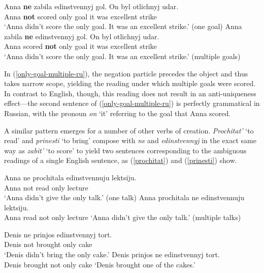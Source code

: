 \documentclass{article}
\begin{document}
\begin{exe}
	\ex \label{only-goal-one-ru} \gll Anna \textbf{ne} zabila edinstvennyj gol. On byl otlichnyj udar.\\
	Anna \textbf{not} scored only goal it was excellent strike\\
	\glt `Anna didn't score the only goal. It was an excellent strike.' (one goal)
	\ex \label{only-goal-multiple-ru} \gll Anna zabila \textbf{ne} edinstvennyj gol. On byl otlichnyj udar.\\
	Anna scored \textbf{not} only goal it was excellent strike\\
	\glt `Anna didn't score the only goal. It was an excellent strike.' (multiple goals)
\end{exe}

In (\ref{only-goal-multiple-ru}), the negation particle precedes the object and thus takes narrow scope, yielding the reading under which multiple goals were scored. In contrast to English, though, this reading does not result in an anti-uniqueness effect---the second sentence of (\ref{only-goal-multiple-ru}) is perfectly grammatical in Russian, with the pronoun \textit{on} `it' referring to the goal that Anna scored.


A similar pattern emerges for a number of other verbs of creation. \textit{Prochitat'} `to read' and \textit{prinesti} `to bring' compose with \textit{ne} and \textit{edinstvennyj} in the exact same way as \textit{zabit'} `to score' to yield two sentences corresponding to the ambiguous readings of a single English sentence, as (\ref{prochitat}) and (\ref{prinesti}) show.

\begin{exe}
	\ex \label{prochitat} \begin{xlist}
		\ex \gll Anna ne prochitala edinstvennuju lektsiju.\\
		Anna not read only lecture\\
		\glt `Anna didn't give the only talk.' (one talk)
		\ex Anna prochitala ne edinstvennuju lektsiju.\\
		Anna read not only lecture
		\glt `Anna didn't give the only talk.' (multiple talks)
	\end{xlist}
	\ex \label{prinesti} \begin{xlist}
		\ex \gll Denis ne prinjos edinstvennyj tort.\\
		Denis not brought only cake\\
		\glt `Denis didn't bring the only cake.'
		\ex Denis prinjos ne edinstvennyj tort.\\
		Denis brought not only cake
		\glt `Denis brought one of the cakes.'
	\end{xlist}
\end{exe}
\end{document}
